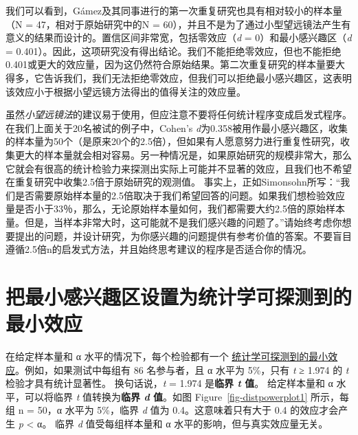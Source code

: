\documentclass[
  letterpaper,
  DIV=11,
  numbers=noendperiod]{scrreprt}
\begin{document}
我们可以看到，Gámez及其同事进行的第一次重复研究也具有相对较小的样本量（N
= 47，相对于原始研究中的N =
60），并且不是为了通过小型望远镜法产生有意义的结果而设计的。置信区间非常宽，包括零效应（\emph{d}
= 0）和最小感兴趣区（\emph{d} =
0.401）。因此，这项研究没有得出结论。我们不能拒绝零效应，但也不能拒绝0.401或更大的效应量，因为这仍然符合原始结果。第二次重复研究的样本量要大得多，它告诉我们，我们无法拒绝零效应，但我们可以拒绝最小感兴趣区，这表明该效应小于根据小望远镜方法得出的值得关注的效应量。

虽然\emph{小望远镜法}的建议易于使用，但应注意不要将任何统计程序变成启发式程序。
在我们上面关于20名被试的例子中，Cohen's
\emph{d}为0.358被用作最小感兴趣区，收集的样本量为50个（是原来20个的2.5倍），但如果有人愿意努力进行重复性研究，收集更大的样本量就会相对容易。另一种情况是，如果原始研究的规模非常大，那么它就会有很高的统计检验力来探测出实际上可能并不显著的效应，且我们也不希望在重复研究中收集2.5倍于原始研究的观测值。
事实上，正如Simonsohn所写：``我们是否需要原始样本量的2.5倍取决于我们希望回答的问题。如果我们想检验效应量是否小于33％，那么，无论原始样本量如何，我们都需要大约2.5倍的原始样本量。但是，当样本非常大时，这可能就不是我们感兴趣的问题了。''请始终考虑你想要提出的问题，并设计研究，为你感兴趣的问题提供有参考价值的答案。不要盲目遵循2.5倍n的启发式方法，并且始终思考建议的程序是否适合你的情况。

\hypertarget{ux628aux6700ux5c0fux611fux5174ux8da3ux533aux8bbeux7f6eux4e3aux7edfux8ba1ux5b66ux53efux63a2ux6d4bux5230ux7684ux6700ux5c0fux6548ux5e94}{%
\section{把最小感兴趣区设置为统计学可探测到的最小效应}\label{ux628aux6700ux5c0fux611fux5174ux8da3ux533aux8bbeux7f6eux4e3aux7edfux8ba1ux5b66ux53efux63a2ux6d4bux5230ux7684ux6700ux5c0fux6548ux5e94}}

在给定样本量和 α 水平的情况下，每个检验都有一个
\protect\hyperlink{minimaldetectable}{统计学可探测到的最小效应}。例如，如果测试中每组有
86 名参与者，且 α 水平为 5\%，只有 \emph{t} ≥ 1.974 的 \emph{t}
检验才具有统计显著性。 换句话说，\emph{t} = 1.974 是\textbf{临界
\emph{t} 值}。 给定样本量和 α 水平，可以将临界 \emph{t}
值转换为\textbf{临界 \emph{d} 值}。如图 Figure~\ref{fig-distpowerplot1}
所示，每组 n = 50，α 水平为 5\%，临界 \emph{d} 值为
0.4。这意味着只有大于 0.4 的效应才会产生 \emph{p} \textless{} α。 临界
\emph{d} 值受每组样本量和 α 水平的影响，但与真实效应量无关。
\end{document}
